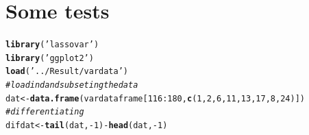 \documentclass[11pt,oneside, a4paper]{amsart}\usepackage[]{graphicx}\usepackage[]{color}
\makeatletter
\newcommand{\hlnum}[1]{\textcolor[rgb]{0.686,0.059,0.569}{#1}}%
\newcommand{\hlstr}[1]{\textcolor[rgb]{0.192,0.494,0.8}{#1}}%
\newcommand{\hlcom}[1]{\textcolor[rgb]{0.678,0.584,0.686}{\textit{#1}}}%
\newcommand{\hlopt}[1]{\textcolor[rgb]{0,0,0}{#1}}%
\newcommand{\hlstd}[1]{\textcolor[rgb]{0.345,0.345,0.345}{#1}}%
\newcommand{\hlkwb}[1]{\textcolor[rgb]{0.69,0.353,0.396}{#1}}%
\newcommand{\hlkwd}[1]{\textcolor[rgb]{0.737,0.353,0.396}{\textbf{#1}}}%
\newenvironment{kframe}{%
 \def\at@end@of@kframe{}%
 \ifinner\ifhmode%
  \def\at@end@of@kframe{\end{minipage}}%
  \begin{minipage}{\columnwidth}%
 \fi\fi%
 \def\FrameCommand##1{\hskip\@totalleftmargin \hskip-\fboxsep
 \colorbox{shadecolor}{##1}\hskip-\fboxsep
     \hskip-\linewidth \hskip-\@totalleftmargin \hskip\columnwidth}%
 \MakeFramed {\advance\hsize-\width
   \@totalleftmargin\z@ \linewidth\hsize
   \@setminipage}}%
 {\par\unskip\endMakeFramed%
 \at@end@of@kframe}
\newenvironment{knitrout}{}{} %
\makeatother
\begin{document}
\section*{Some tests}


\begin{knitrout}
\color{fgcolor}\begin{kframe}
\begin{alltt}
\hlkwd{library}\hlstd{(}\hlstr{'lassovar'}\hlstd{)}
\hlkwd{library}\hlstd{(}\hlstr{'ggplot2'}\hlstd{)}
\hlkwd{load}\hlstd{(}\hlstr{'../Result/vardata'}\hlstd{)}
\hlcom{# loadind and subseting the data}
\hlstd{dat} \hlkwb{<-} \hlkwd{data.frame}\hlstd{(vardataframe[}\hlnum{116}\hlopt{:}\hlnum{180}\hlstd{,} \hlkwd{c}\hlstd{(}\hlnum{1}\hlstd{,}\hlnum{2}\hlstd{,}\hlnum{6}\hlstd{,}\hlnum{11}\hlstd{,}\hlnum{13}\hlstd{,}\hlnum{17}\hlstd{,}\hlnum{8}\hlstd{,}\hlnum{24}\hlstd{) ])}
\hlcom{# differentiating}
\hlstd{difdat} \hlkwb{<-} \hlkwd{tail}\hlstd{(dat,}\hlopt{-}\hlnum{1}\hlstd{)} \hlopt{-} \hlkwd{head}\hlstd{(dat,}\hlopt{-}\hlnum{1}\hlstd{)}
\end{alltt}
\end{kframe}
\end{knitrout}
\end{document}
